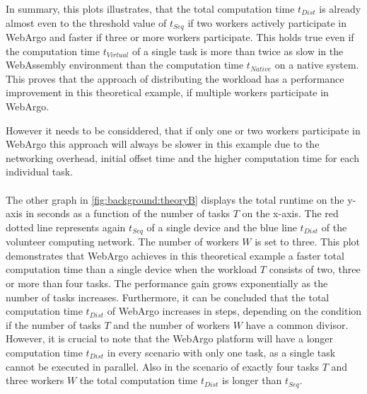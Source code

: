 In summary, this plots illustrates, that the total computation time $t_{Dist}$ is already almost even to the threshold value of $t_{Seq}$ if two workers actively participate in WebArgo and faster if three or more workers participate. This holds true even if the computation time $t_{Virtual}$ of a single task is more than twice as slow in the WebAssembly environment than the computation time $t_{Native}$ on a native system. This proves that the approach of distributing the workload has a performance improvement in this theoretical example, if multiple workers participate in WebArgo. 

However it needs to be considdered, that if only one or two workers participate in WebArgo this approach will always be slower in this example due to the networking overhead, initial offset time and the higher computation time for each individual task.
\\~\\
The other graph in \autoref{fig:background:theoryB} displays the total runtime on the y-axis in seconds as a function of the number of tasks $T$ on the x-axis. The red dotted line represents again $t_{Seq}$ of a single device and the blue line $t_{Dist}$ of the volunteer computing network. The number of workers $W$ is set to three. This plot demonstrates that WebArgo achieves in this theoretical example a faster total computation time than a single device when the workload $T$ consists of two, three or more than four tasks. The performance gain grows exponentially as the number of tasks increases. Furthermore, it can be concluded that the total computation time $t_{Dist}$ of WebArgo increases in steps, depending on the condition if the number of tasks $T$ and the number of workers $W$ have a common divisor. However, it is crucial to note that the WebArgo platform will have a longer computation time $t_{Dist}$ in every scenario with only one task, as a single task cannot be executed in parallel. Also in the scenario of exactly four tasks $T$ and three workers $W$ the total computation time $t_{Dist}$ is longer than $t_{Seq}$.